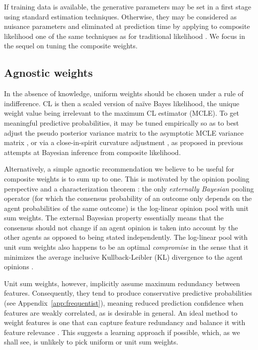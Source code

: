 \documentclass[english]{scrartcl}
\begin{document}
If training data is available, the generative parameters may be set in a first stage using standard estimation techniques. Otherwise, they may be considered as nuisance parameters and eliminated at prediction time by applying to composite likelihood one of the same techniques as for traditional likelihood \cite{Berger-99}. We focus in the sequel on tuning the composite weights.


\subsection{Agnostic weights}

In the absence of knowledge, uniform weights should be chosen under a rule of indifference. CL is then a scaled version of na\"ive Bayes likelihood, the unique weight value being irrelevant to the maximum CL estimator (MCLE). To get meaningful predictive probabilities, it may be tuned empirically so as to best adjust the pseudo posterior variance matrix to the asymptotic MCLE variance matrix \cite{Pauli-11}, or via a close-in-spirit curvature adjustment \cite{Ribatet-12}, as proposed in previous attempts at Bayesian inference from composite likelihood. 


Alternatively, a simple agnostic recommendation we believe to be useful for composite weights is to sum up to one. This is motivated by the opinion pooling perspective and a characterization theorem \cite{Genest-86,Genest-86b}: the only {\em externally Bayesian} pooling operator (for which the consensus probability of an outcome only depends on the agent probabilities of the same outcome) is the log-linear opinion pool with unit sum weights. The external Bayesian  property essentially means that the consensus should not change if an agent opinion is taken into account by the other agents as opposed to being stated independently. The log-linear pool with unit sum weights also happens to be an optimal {\em compromise} in the sense that it minimizes the average inclusive Kullback-Leibler (KL) divergence to the agent opinions \cite{Garg-04}. 


Unit sum weights, however, implicitly assume maximum redundancy between features. Consequently, they tend to produce conservative predictive probabilities (see Appendix~\ref{app:frequentist}), meaning reduced prediction confidence when features are weakly correlated, as is desirable in general. An ideal method to weight features is one that can capture feature redundancy and balance it with feature relevance \cite{Peng-05}. This suggests a learning approach if possible, which, as we shall see, is unlikely to pick uniform or unit sum weights.
\end{document}
